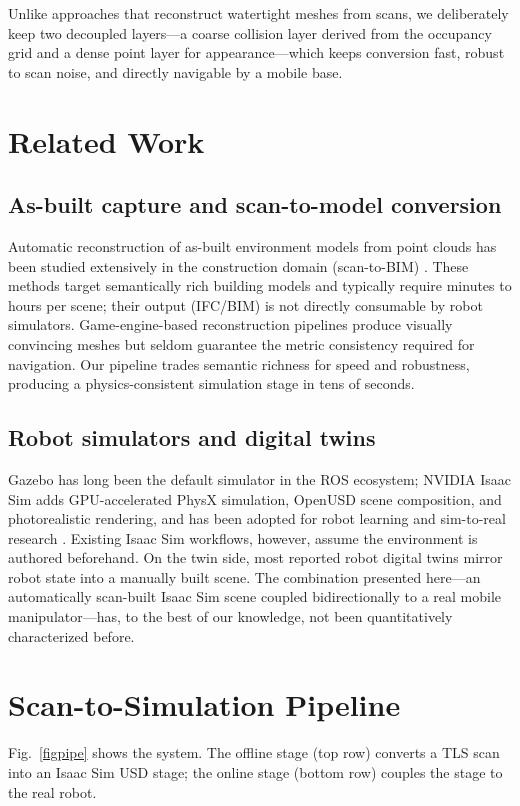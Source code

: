 \documentclass[conference]{IEEEtran}
\begin{document}
Unlike approaches that reconstruct watertight meshes from scans, we
deliberately keep two decoupled layers---a coarse collision layer
derived from the occupancy grid and a dense point layer for
appearance---which keeps conversion fast, robust to scan noise, and
directly navigable by a mobile base.

\section{Related Work}
\subsection{As-built capture and scan-to-model conversion}
Automatic reconstruction of as-built environment models from point
clouds has been studied extensively in the construction domain
(scan-to-BIM) \cite{scan2bim}. These methods target semantically rich
building models and typically require minutes to hours per scene;
their output (IFC/BIM) is not directly consumable by robot simulators.
Game-engine-based reconstruction pipelines produce visually convincing
meshes but seldom guarantee the metric consistency required for
navigation. Our pipeline trades semantic richness for speed and
robustness, producing a physics-consistent simulation stage in tens of
seconds.

\subsection{Robot simulators and digital twins}
Gazebo \cite{gazebo} has long been the default simulator in the ROS
ecosystem; NVIDIA Isaac Sim adds GPU-accelerated PhysX simulation,
OpenUSD scene composition, and photorealistic rendering, and has been
adopted for robot learning \cite{orbit} and sim-to-real research
\cite{sim2real}. Existing Isaac Sim workflows, however, assume the
environment is authored beforehand. On the twin side, most reported
robot digital twins mirror robot state into a manually built scene.
The combination presented here---an automatically scan-built Isaac Sim
scene coupled bidirectionally to a real mobile manipulator---has, to
the best of our knowledge, not been quantitatively characterized before.

\section{Scan-to-Simulation Pipeline}
Fig.~\ref{figpipe} shows the system. The offline stage (top row)
converts a TLS scan into an Isaac Sim USD stage; the online stage
(bottom row) couples the stage to the real robot.
\end{document}

